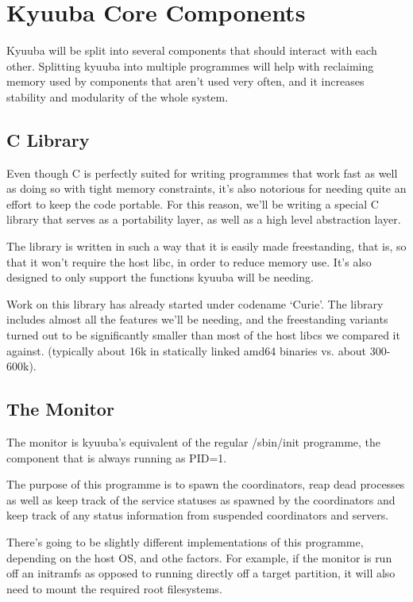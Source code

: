 \documentclass[a4paper,twoside,titlepage]{article}
\begin{document}
\section{Kyuuba Core Components}
Kyuuba will be split into several components that should interact with each
other. Splitting kyuuba into multiple programmes will help with reclaiming
memory used by components that aren't used very often, and it increases
stability and modularity of the whole system.

\subsection{C Library}
Even though C is perfectly suited for writing programmes that work fast as well
as doing so with tight memory constraints, it's also notorious for needing quite
an effort to keep the code portable. For this reason, we'll be writing a special
C library that serves as a portability layer, as well as a high level
abstraction layer.

The library is written in such a way that it is easily made freestanding, that
is, so that it won't require the host libc, in order to reduce memory use. It's
also designed to only support the functions kyuuba will be needing.

Work on this library has already started under codename `Curie'. The library
includes almost all the features we'll be needing, and the freestanding variants
turned out to be significantly smaller than most of the host libcs we compared
it against. (typically about 16k in statically linked amd64 binaries vs. about
300-600k).

\subsection{The Monitor}
The monitor is kyuuba's equivalent of the regular /sbin/init programme, the
component that is always running as PID=1.

The purpose of this programme is to spawn the coordinators, reap dead processes
as well as keep track of the service statuses as spawned by the coordinators and
keep track of any status information from suspended coordinators and servers.

There's going to be slightly different implementations of this programme,
depending on the host OS, and othe factors. For example, if the monitor is run
off an initramfs as opposed to running directly off a target partition, it will
also need to mount the required root filesystems.
\end{document}
